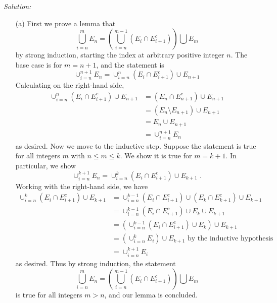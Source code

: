 \documentclass[letterpaper,10pt]{article}
\begin{document}
\textit{Solution:}
\begin{enumerate}
\item[(a)]
First we prove a lemma that
\[
\bigcup_{i=n}^m E_n = \left(\bigcup_{i=n}^{m-1} (E_i \cap E_{i+1}^c)\right) \bigcup E_m
\]
by strong induction, starting the index at arbitrary positive integer $n$.
The base case is for $m = n+1$, and the statement is 
$$
\cup_{i=n}^{n+1}E_n = \cup_{i=n}^n(E_i \cap E_{i+1}^c) \cup E_{n+1}
$$
Calculating on the right-hand side, 
\begin{align*}
\cup_{i=n}^n(E_i \cap E_{i+1}^c) \cup E_{n+1} &= (E_n \cap E_{n+1}^c) \cup E_{n+1} \\
&= (E_n \setminus E_{n+1}) \cup E_{n+1} \\
&= E_n \cup E_{n+1} \\
&= \cup_{i=n}^{n+1}E_n
\end{align*}
as desired. Now we move to the inductive step. Suppose the statement is true for all integers $m$ with $n \leq m \leq k$. We show it is true for $m = k+1$. In particular, we show
\[
\cup_{i=n}^{k+1}E_n = \cup_{i=n}^k (E_i \cap E_{i+1}^c) \cup E_{k+1} 
\text{ .}
\]
Working with the right-hand side, we have
\begin{align*}
\cup_{i=n}^k (E_i \cap E_{i+1}^c) \cup E_{k+1} 
&= \cup_{i=n}^{k-1} (E_i \cap E_{i+1}^c) \cup (E_k \cap E_{k+1}^c) \cup E_{k+1} \\
&= \cup_{i=n}^{k-1} (E_i \cap E_{i+1}^c) \cup E_k \cup E_{k+1} \\
&= (\cup_{i=n}^{k-1} (E_i \cap E_{i+1}^c) \cup E_k) \cup E_{k+1} \\
&= (\cup_{i=n}^k E_i ) \cup E_{k+1} 
\text{ by the inductive hypothesis} \\
&= \cup_{i=n}^{k+1} E_i
\end{align*}
as desired. Thus by strong induction, the statement 
\[
\bigcup_{i=n}^m E_n = \left(\bigcup_{i=n}^{m-1} (E_i \cap E_{i+1}^c)\right) \bigcup E_m
\]
is true for all integers $m > n$, and our lemma is concluded.


\end{enumerate}
\end{document}
